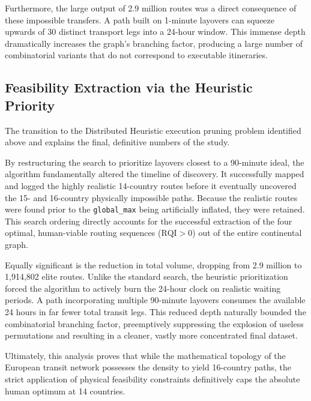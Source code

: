 \medskip

Furthermore, the large output of 2.9 million routes was a direct consequence of these impossible transfers. A path built on 1-minute layovers can squeeze upwards of 30 distinct transport legs into a 24-hour window. This immense depth dramatically increases the graph's branching factor, producing a large number of combinatorial variants that do not correspond to executable itineraries.

\subsection{Feasibility Extraction via the Heuristic Priority}
\label{subsec:feasibility_extraction_heuristic_priority}

The transition to the Distributed Heuristic execution pruning problem identified above and explains the final, definitive numbers of the study.

\medskip

By restructuring the search to prioritize layovers closest to a 90-minute ideal, the algorithm fundamentally altered the timeline of discovery. It successfully mapped and logged the highly realistic 14-country routes before it eventually uncovered the 15- and 16-country physically impossible paths. Because the realistic routes were found prior to the \texttt{global\_max} being artificially inflated, they were retained. This search ordering directly accounts for the successful extraction of the four optimal, human-viable routing sequences ($\mathrm{RQI} > 0$) out of the entire continental graph.

\medskip

Equally significant is the reduction in total volume, dropping from 2.9 million to 1,914,802 elite routes. Unlike the standard search, the heuristic prioritization forced the algorithm to actively burn the 24-hour clock on realistic waiting periods. A path incorporating multiple 90-minute layovers consumes the available 24 hours in far fewer total transit legs. This reduced depth naturally bounded the combinatorial branching factor, preemptively suppressing the explosion of useless permutations and resulting in a cleaner, vastly more concentrated final dataset.

Ultimately, this analysis proves that while the mathematical topology of the European transit network possesses the density to yield 16-country paths, the strict application of physical feasibility constraints definitively caps the absolute human optimum at 14 countries.

